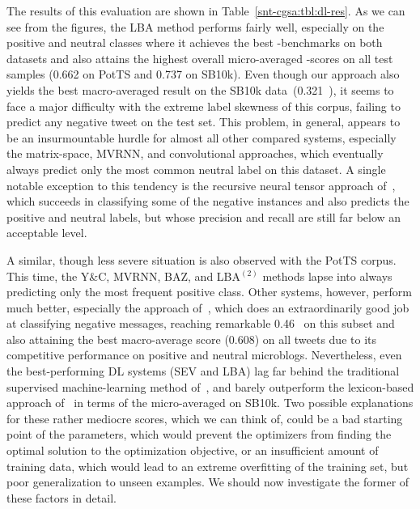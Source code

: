 The results of this evaluation are shown in
Table~\ref{snt-cgsa:tbl:dl-res}.  As we can see from the figures, the
LBA method performs fairly well, especially on the positive and
neutral classes where it achieves the best \F-benchmarks on both
datasets and also attains the highest overall micro-averaged \F-scores
on all test samples (0.662 on PotTS and 0.737 on SB10k).  Even though
our approach also yields the best macro-averaged result on the SB10k
data~(0.321~\F), it seems to face a major difficulty with the extreme
label skewness of this corpus, failing to predict any negative tweet
on the test set.  This problem, in general, appears to be an
insurmountable hurdle for almost all other compared systems,
especially the matrix-space, MVRNN, and convolutional approaches,
which eventually always predict only the most common neutral label on
this dataset.  A single notable exception to this tendency is the
recursive neural tensor approach of~\citet{Socher:13}, which succeeds
in classifying some of the negative instances and also predicts the
positive and neutral labels, but whose precision and recall are still
far below an acceptable level.

A similar, though less severe situation is also observed with the
PotTS corpus.  This time, the Y\&C, MVRNN, BAZ, and LBA$^{(2)}$
methods lapse into always predicting only the most frequent positive
class.  Other systems, however, perform much better, especially the
approach of~\citet{Severyn:15}, which does an extraordinarily good job
at classifying negative messages, reaching remarkable 0.46~\F{} on
this subset and also attaining the best macro-average score (0.608) on
all tweets due to its competitive performance on positive and neutral
microblogs.  Nevertheless, even the best-performing DL systems (SEV
and LBA) lag far behind the traditional supervised machine-learning
method of~\citet{Mohammad:13}, and barely outperform the lexicon-based
approach of~\citet{Hu:04} in terms of the micro-averaged \F{} on
SB10k.  Two possible explanations for these rather mediocre scores,
which we can think of, could be a bad starting point of the
parameters, which would prevent the optimizers from finding the
optimal solution to the optimization objective, or an insufficient
amount of training data, which would lead to an extreme overfitting of
the training set, but poor generalization to unseen examples.  We
should now investigate the former of these factors in detail.


